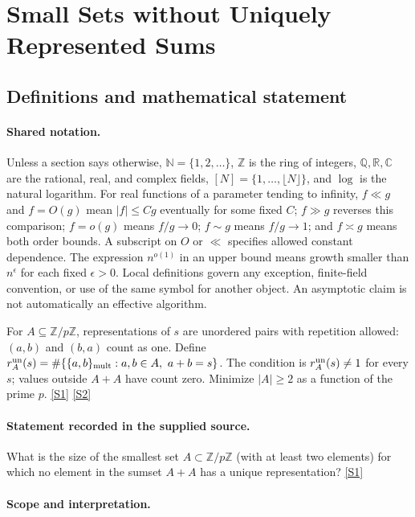 \documentclass[11pt,a4paper]{article}
\newcommand{\N}{\mathbb{N}}
\newcommand{\Z}{\mathbb{Z}}
\newcommand{\Q}{\mathbb{Q}}
\newcommand{\R}{\mathbb{R}}
\newcommand{\C}{\mathbb{C}}
\newcommand{\sref}[2]{\hyperlink{source:#1:#2}{[S#2]}}
\begin{document}
\section{Small Sets without Uniquely Represented Sums}\label{statement}


\subsection{Definitions and mathematical statement}

\paragraph{Shared notation.}Unless a section says otherwise, $\N=\{1,2,\ldots\}$,
$\Z$ is the ring of integers, $\Q,\R,\C$ are the rational, real, and complex
fields, $[N]=\{1,\ldots,\lfloor N\rfloor\}$, and $\log$ is the natural
logarithm. For real functions of a parameter tending to infinity,
$f\ll g$ and $f=O(g)$ mean $|f|\leq Cg$ eventually for some fixed $C$;
$f\gg g$ reverses this comparison; $f=o(g)$ means $f/g\to0$;
$f\sim g$ means $f/g\to1$; and $f\asymp g$ means both order bounds.
A subscript on $O$ or $\ll$ specifies allowed constant dependence.
The expression $n^{o(1)}$ in an upper bound means growth smaller than
$n^\epsilon$ for each fixed $\epsilon>0$. Local definitions govern any
exception, finite-field convention, or use of the same symbol for another
object. An asymptotic claim is not automatically an effective algorithm.



For $A\subseteq\Z/p\Z$, representations of $s$ are unordered pairs with repetition allowed: $(a,b)$ and $(b,a)$ count as one. Define $r_A^{\rm un}(s)=\#\{\{a,b\}_{\rm mult}:a,b\in A,\ a+b=s\}$. The condition is $r_A^{\rm un}(s)\ne1$ for every $s$; values outside $A+A$ have count zero. Minimize $|A|\geq2$ as a function of the prime $p$. \sref{statement}{1} \sref{statement}{2}

\paragraph{Statement recorded in the supplied source.}
What is the size of the smallest set $A \subset \mathbb{Z}/p\mathbb{Z}$ (with at least two elements) for which no element in the sumset $A + A$ has a unique representation? \sref{statement}{1}

\paragraph{Scope and interpretation.}
\end{document}
